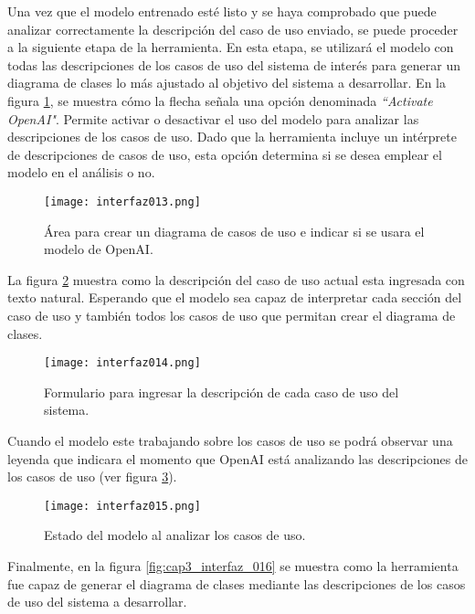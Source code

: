Una vez que el modelo entrenado esté listo y se haya comprobado que puede analizar correctamente la descripción del caso de uso enviado, se puede proceder a la siguiente etapa de la herramienta. En esta etapa, se utilizará el modelo con todas las descripciones de los casos de uso del sistema de interés para generar un diagrama de clases lo más ajustado al objetivo del sistema a desarrollar. En la figura \ref{fig:cap3_interfaz_013}, se muestra cómo la flecha señala una opción denominada \textit{``Activate OpenAI"}. Permite activar o desactivar el uso del modelo para analizar las descripciones de los casos de uso. Dado que la herramienta incluye un intérprete de descripciones de casos de uso, esta opción determina si se desea emplear el modelo en el análisis o no.


 \begin{figure}[H]  
	\centering
	\texttt{[image: interfaz013.png]} 
	\caption{Área para crear un diagrama de casos de uso e indicar si se usara el modelo de OpenAI.}
	\label{fig:cap3_interfaz_013}
\end{figure}

La figura \ref{fig:cap3_interfaz_014} muestra como la descripción del caso de uso actual esta ingresada con texto natural. Esperando que el modelo sea capaz de interpretar cada sección del caso de uso y también todos los casos de uso que permitan crear el diagrama de clases. 

 \begin{figure}[H]  
	\centering
	\texttt{[image: interfaz014.png]} 
	\caption{Formulario para ingresar la descripción de cada caso de uso del sistema.}
	\label{fig:cap3_interfaz_014}
\end{figure}

Cuando el modelo este trabajando sobre los casos de uso se podrá observar una leyenda que indicara el momento que OpenAI está analizando las descripciones de los casos de uso (ver figura \ref{fig:cap3_interfaz_015}). 

 \begin{figure}[H]  
	\centering
	\texttt{[image: interfaz015.png]} 
	\caption{Estado del modelo al analizar los casos de uso.}
	\label{fig:cap3_interfaz_015}
\end{figure}

Finalmente, en la figura \ref{fig:cap3_interfaz_016} se muestra como la herramienta fue capaz de generar el diagrama de clases mediante las descripciones de los casos de uso del sistema a desarrollar.

